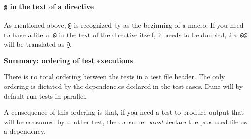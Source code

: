 \begin{important}
\paragraph{\texttt{@} in the text of a directive}
As mentioned above, \texttt{@} is recognized by \ptests as the beginning of
a macro. If you need to have a literal \texttt{@} in the text of the directive
itself, it needs to be doubled, {\it i.e.} \texttt{@@} will be translated as
\texttt{@}.
\end{important}

\begin{important}
  \textbf{Summary: ordering of test executions}

  There is no total ordering between the tests in a test file header.
  The only ordering is dictated by the dependencies declared in the test cases.
  Dune will by default run tests in parallel.

  A consequence of this ordering is that, if you need a test to produce output
  that will be consumed by another test, the consumer \emph{must} declare the
  produced file as a dependency.
\end{important}

